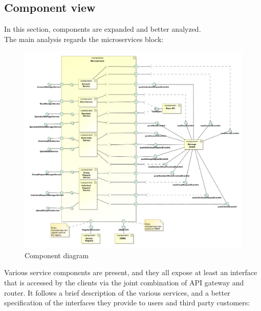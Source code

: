 \subsection{Component view}
In this section, components are expanded and better analyzed. \\
The main analysis regards the microservices block: 
\begin{figure}[H]
\includegraphics[width=\linewidth]{Images/componentdiagram.pdf}
\caption{ Component diagram }
\label{fig:componentdiagram}
\end{figure}
Various service components are present, and they all expose at least an interface that is accessed by the
clients via the joint combination of API gateway and router. It follows a brief description of the various services, and a better
specification of the interfaces they provide to users and third party customers:
